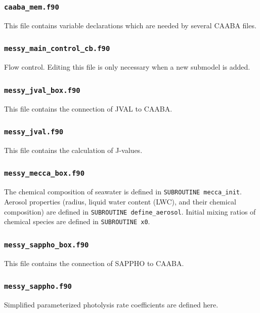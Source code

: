 \documentclass[twoside]{article}
\begin{document}
\subsubsection{{\tt caaba\_mem.f90}}

This file contains variable declarations which are needed by several
CAABA files.

\subsubsection{{\tt messy\_main\_control\_cb.f90}}

Flow control. Editing this file is only necessary when a new submodel is
added.

\subsubsection{{\tt messy\_jval\_box.f90}}

This file contains the connection of JVAL to CAABA.

\subsubsection{{\tt messy\_jval.f90}}

This file contains the calculation of J-values.

\subsubsection{{\tt messy\_mecca\_box.f90}}

The chemical composition of seawater is defined in
\verb|SUBROUTINE mecca_init|. Aerosol properties (radius, liquid water
content (LWC), and their chemical composition) are defined in
\verb|SUBROUTINE define_aerosol|. Initial mixing ratios of chemical
species are defined in \verb|SUBROUTINE x0|.

\subsubsection{{\tt messy\_sappho\_box.f90}}

This file contains the connection of SAPPHO to CAABA.

\subsubsection{{\tt messy\_sappho.f90}}

Simplified parameterized photolysis rate coefficients are defined here.
\end{document}
